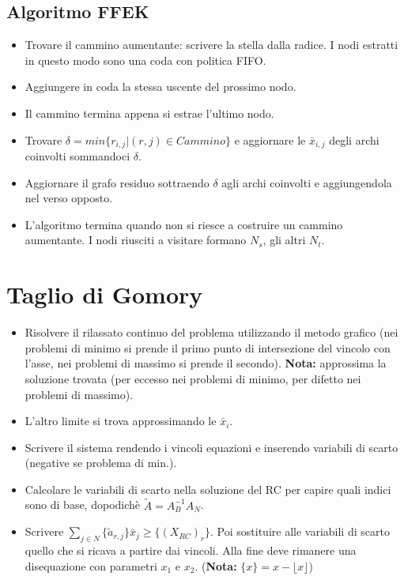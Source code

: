 \documentclass[9pt]{extarticle}
\begin{document}
\begin{multicols}{2}
\subsection{Algoritmo FFEK}
\begin{itemize}
    \setlength{\itemsep}{-3pt}
    \item Trovare il cammino aumentante: scrivere la stella dalla radice. I
        nodi estratti in questo modo sono una coda con politica FIFO.
    \item Aggiungere in coda la stessa uscente del prossimo nodo.
    \item Il cammino termina appena si estrae l'ultimo nodo.
    \item Trovare $\delta = min\{r_{i,j} | (r,j) \in Cammino\}$ e aggiornare le
        $\bar{x}_{i,j}$ degli archi coinvolti sommandoci $\delta$.
    \item Aggiornare il grafo residuo sottraendo $\delta$ agli archi coinvolti e
        aggiungendola nel verso opposto.
    \item L'algoritmo termina quando non si riesce a costruire un cammino
        aumentante. I nodi riusciti a visitare formano $N_s$, gli altri $N_t$.
\end{itemize}

\section{Taglio di Gomory}
\begin{itemize}
    \setlength{\itemsep}{-3pt}
    \item Risolvere il rilassato continuo del problema utilizzando il metodo
        grafico (nei problemi di minimo si prende il primo punto di
        intersezione del vincolo con l'asse, nei problemi di massimo si prende
        il secondo).
        \textbf{Nota:} approssima la soluzione trovata (per eccesso nei
        problemi di minimo, per difetto nei problemi di massimo).
    \item L'altro limite si trova approssimando le $\bar{x}_i$.
    \item Scrivere il sistema rendendo i vincoli equazioni e inserendo
        variabili di scarto (negative se problema di min.).
    \item Calcolare le variabili di scarto nella soluzione del RC per capire
        quali indici sono di base, dopodichè $\tilde{A} = A_B^{-1}A_N$.
    \item Scrivere $\sum_{j \in N} \{\tilde{a}_{r,j}\} \bar{x}_j \ge
        \{(X_{RC})_r\}$. Poi sostituire alle variabili di scarto quello che si
        ricava a partire dai vincoli. Alla fine deve rimanere una disequazione
        con parametri $x_1$ e $x_2$.
        (\textbf{Nota:} $\{x\} = x - \lfloor x \rfloor$)


\end{itemize}
\end{multicols}
\end{document}
